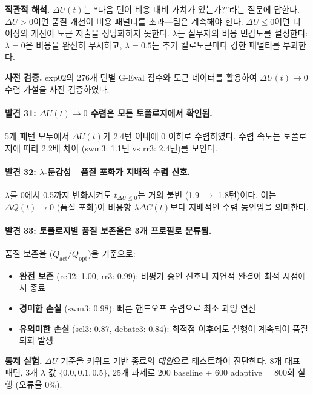 \documentclass[a4paper,11pt]{article}
\begin{document}
\textbf{직관적 해석.} $\Delta U(t)$는 ``다음 턴이 비용 대비 가치가 있는가?''라는 질문에 답한다. $\Delta U > 0$이면 품질 개선이 비용 패널티를 초과---팀은 계속해야 한다. $\Delta U \leq 0$이면 더 이상의 개선이 토큰 지출을 정당화하지 못한다. $\lambda$는 실무자의 비용 민감도를 설정한다: $\lambda=0$은 비용을 완전히 무시하고, $\lambda=0.5$는 추가 킬로토큰마다 강한 패널티를 부과한다.

\textbf{사전 검증.} exp02의 276개 턴별 G-Eval 점수와 토큰 데이터를 활용하여 $\Delta U(t) \to 0$ 수렴 가설을 사전 검증하였다.


\paragraph{발견 31: $\Delta U(t) \to 0$ 수렴은 모든 토폴로지에서 확인됨.}
5개 패턴 모두에서 $\Delta U(t)$가 2.4턴 이내에 0 이하로 수렴하였다. 수렴 속도는 토폴로지에 따라 2.2배 차이 (swm3: 1.1턴 vs rr3: 2.4턴)를 보인다.

\paragraph{발견 32: $\lambda$-둔감성---품질 포화가 지배적 수렴 신호.}
$\lambda$를 0에서 0.5까지 변화시켜도 $t_{\Delta U \leq 0}$는 거의 불변 (1.9 $\to$ 1.8턴)이다. 이는 $\Delta Q(t) \to 0$ (품질 포화)이 비용항 $\lambda \Delta C(t)$보다 지배적인 수렴 동인임을 의미한다.


\paragraph{발견 33: 토폴로지별 품질 보존율은 3개 프로필로 분류됨.}
품질 보존율 ($Q_{\text{act}}/Q_{\text{opt}}$)을 기준으로:
\begin{itemize}
  \item \textbf{완전 보존} (refl2: 1.00, rr3: 0.99): 비평가 승인 신호나 자연적 완결이 최적 시점에서 종료
  \item \textbf{경미한 손실} (swm3: 0.98): 빠른 핸드오프 수렴으로 최소 과잉 연산
  \item \textbf{유의미한 손실} (sel3: 0.87, debate3: 0.84): 최적점 이후에도 실행이 계속되어 품질 퇴화 발생
\end{itemize}

\textbf{통제 실험.} $\Delta U$ 기준을 키워드 기반 종료의 \emph{대안}으로 테스트하여 진단한다. 8개 대표 패턴, 3개 $\lambda$ 값 $\{0.0, 0.1, 0.5\}$, 25개 과제로 200 baseline + 600 adaptive = 800회 실행 (오류율 0\%).
\end{document}
